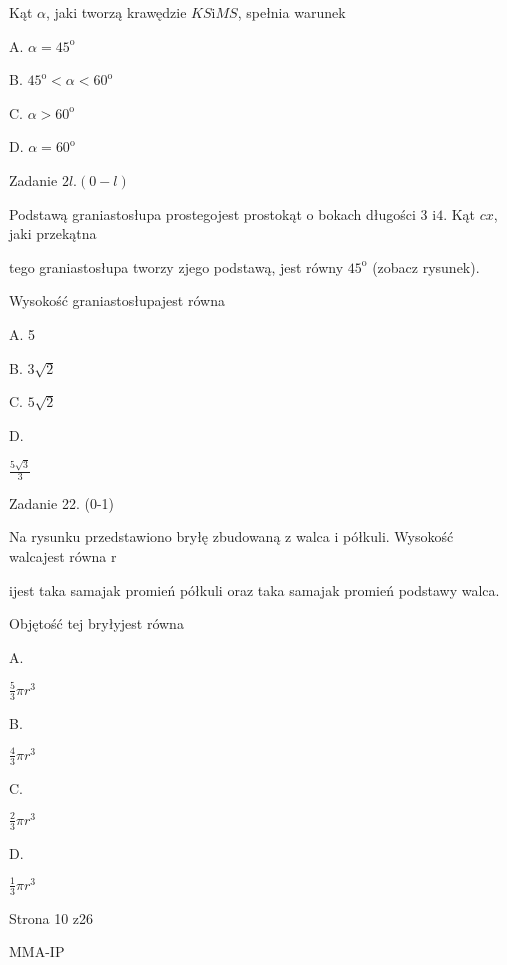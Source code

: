 \documentclass[a4paper,12pt]{article}
\begin{document}
Kąt $\alpha$, jaki tworzą krawędzie $KS\mathrm{i}MS$, spełnia warunek

A. $\alpha=45^{\mathrm{o}}$

B. $45^{\mathrm{o}}<\alpha<60^{\mathrm{o}}$

C. $\alpha>60^{\mathrm{o}}$

D. $\alpha=60^{\mathrm{o}}$

Zadanie $2l. (0-l)$

Podstawą graniastosłupa prostegojest prostokąt o bokach długości 3 $\mathrm{i}4$. Kąt $cx$, jaki przekątna

tego graniastosłupa tworzy zjego podstawą, jest równy $45^{\mathrm{o}}$ (zobacz rysunek).

Wysokość graniastosłupajest równa

A. 5

B. $3\sqrt{2}$

C. $5\sqrt{2}$

D.

$\displaystyle \frac{5\sqrt{3}}{3}$

Zadanie 22. (0-1)

Na rysunku przedstawiono bryłę zbudowaną z walca i półkuli. Wysokość walcajest równa r

ijest taka samajak promień półkuli oraz taka samajak promień podstawy walca.

Objętość tej bryłyjest równa

A.

$\displaystyle \frac{5}{3}\pi r^{3}$

B.

$\displaystyle \frac{4}{3}\pi r^{3}$

C.

$\displaystyle \frac{2}{3}\pi r^{3}$

D.

$\displaystyle \frac{1}{3}\pi r^{3}$

Strona 10 z26

MMA-IP
\end{document}

